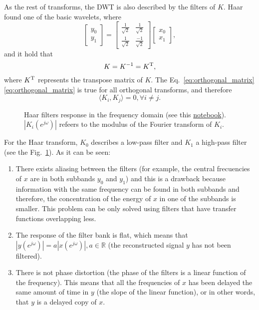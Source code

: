 As the rest of transforms, the DWT is also described by the filters of
$K$. Haar found one of the basic wavelets, where
\begin{equation}
  \begin{bmatrix}
    y_0 \\
    y_1
  \end{bmatrix}
  = 
  \begin{bmatrix} \frac{1}{\sqrt{2}} & \frac{1}{\sqrt{2}} \\ \frac{1}{\sqrt{2}} & \frac{-1}{\sqrt{2}} \end{bmatrix}
  \begin{bmatrix}
    x_0 \\
    x_1
  \end{bmatrix},
  \label{eq:Haar_transform}
\end{equation}
and it hold that
\begin{equation}
  K=K^{-1}=K^{\text T},
  \label{eq:orthogonal_matrix}
\end{equation}
where $K^{\text T}$ represents the transpose matrix of $K$. The
Eq.~\ref{eq:orthogonal_matrix} \ref{eq:orthogonal_matrix} is true for all orthogonal transforms,
and therefore
\begin{equation}
  \langle K_i, K_j\rangle = 0, \forall i\neq j.
\end{equation}

\begin{figure}
  \centering
  \caption{Haar filters response in the frequency domain (see this
    \href{}{notebook}). $|K_i(e^{j\omega})|$ refeers to the
    modulus of the Fourier transform of $K_i$.}
  \label{fig:haar_filters_response}
\end{figure}

For the Haar transform, $K_0$ describes a low-pass filter and $K_1$ a
high-pass filter (see the Fig.~\ref{fig:haar_filters_response}). As it can be seen:
\begin{enumerate}
\item There exists aliasing between the filters (for example, the
  central frecuencies of $x$ are in both subbands $y_0$ and $y_1$) and
  this is a drawback because information with the same frequency can
  be found in both subbands and therefore, the concentration of the
  energy of $x$ in one of the subbands is smaller. This problem can be
  only solved using filters that have transfer functions overlapping
  less.
\item The response of the filter bank is flat, which means that
  $|y(e^{j\omega})|=a|x(e^{j\omega})|, a\in\mathbb{R}$ (the
  reconstructed signal $y$ has not been filtered).
\item There is not phase distortion (the phase of the filters is a
  linear function of the frequency). This means that all the
  frequencies of $x$ has been delayed the same amount of time in $y$
  (the slope of the linear function), or in other words, that $y$ is a
  delayed copy of $x$.
\end{enumerate}

